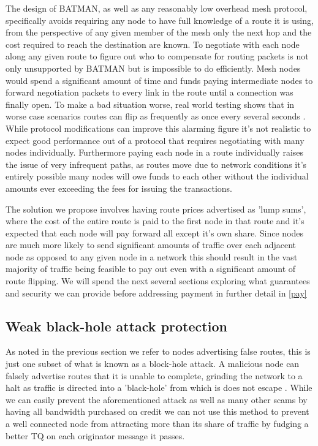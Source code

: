 \documentclass[11pt]{article}
\begin{document}
               The design of BATMAN, as well as any reasonably low overhead mesh protocol, specifically avoids requiring any node to have full knowledge of a route it is using, from the perspective of any given member of the mesh only the next hop and the cost required to reach the destination are known. To negotiate with each node along any given route to figure out who to compensate for routing packets is not only unsupported by BATMAN but is impossible to do efficiently. Mesh nodes would spend a significant amount of time and funds paying intermediate nodes to forward negotiation packets to every link in the route until a connection was finally open. To make a bad situation worse, real world testing shows that in worse case scenarios routes can flip as frequently as once every several seconds \cite{meshflip}. While protocol modifications can improve this alarming figure it's not realistic to expect good performance out of a protocol that requires negotiating with many nodes individually. Furthermore paying each node in a route individually raises the issue of very infrequent paths, as routes move due to network conditions it's entirely possible many nodes will owe funds to each other without the individual amounts ever exceeding the fees for issuing the transactions.

               The solution we propose involves having route prices advertised as 'lump sums', where the cost of the entire route is paid to the first node in that route and it's expected that each node will pay forward all except it's own share. Since nodes are much more likely to send significant amounts of traffic over each adjacent node as opposed to any given node in a network this should result in the vast majority of traffic being feasible to pay out even with a significant amount of route flipping. We will spend the next several sections exploring what guarantees and security we can provide before addressing payment in further detail in \ref{pay}

    \subsection{Weak black-hole attack protection} \label{blackhole}
    
               As noted in the previous section we refer to nodes advertising false routes, this is just one subset of what is known as a block-hole attack. A malicious node can falsely advertise routes that it is unable to complete, grinding the network to a halt as traffic is directed into a 'black-hole' from which is does not escape \cite{routesec}. While we can easily prevent the aforementioned attack as well as many other scams by having all bandwidth purchased on credit we can not use this method to prevent a well connected node from attracting more than its share of traffic by fudging a better TQ on each originator message it passes.
               
\end{document}
